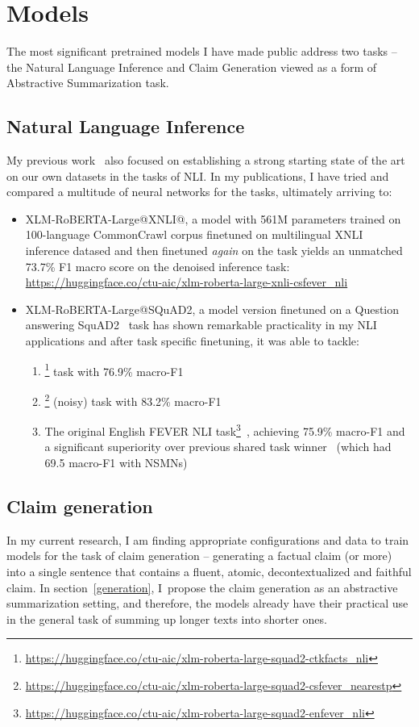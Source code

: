 \section{Models}
\label{sec:models}
The most significant pretrained models I have made public address two tasks -- the Natural Language Inference and Claim Generation viewed as a form of Abstractive Summarization task.
\subsection{Natural Language Inference}
My previous work~\cite{diplomka, lrev} also focused on establishing a strong starting state of the art on our own datasets in the tasks of NLI.
In my publications, I have tried and compared a multitude of neural networks for the tasks, ultimately arriving to:
\begin{itemize}
    \item {\techbf XLM-RoBERTA-Large@XNLI@\FCZNLI}, a model with 561M parameters trained on 100-language CommonCrawl corpus finetuned on multilingual XNLI~\cite{conneau2018xnli} inference datased and then finetuned \textit{again} on the \FCZNLI task yields an unmatched 73.7\% F1 macro score on the denoised \FCZNLI inference task: \url{https://huggingface.co/ctu-aic/xlm-roberta-large-xnli-csfever_nli}
    \item {\techbf XLM-RoBERTA-Large@SQuAD2}, a model version finetuned on a Question answering SquAD2~\cite{squad} task has shown remarkable practicality in my NLI applications and after task specific finetuning, it was able to tackle:
    \begin{enumerate}
        \item \CTKNLI\footnote{\url{https://huggingface.co/ctu-aic/xlm-roberta-large-squad2-ctkfacts_nli}} task with 76.9\% macro-F1
        \item \FCZ\footnote{\url{https://huggingface.co/ctu-aic/xlm-roberta-large-squad2-csfever_nearestp}} (noisy) task with 83.2\% macro-F1
        \item The original English FEVER NLI task\footnote{\url{https://huggingface.co/ctu-aic/xlm-roberta-large-squad2-enfever_nli}}~\cite{fever,nie2019combining}, achieving 75.9\% macro-F1 and a significant superiority over previous shared task winner~\cite{nie2019combining} (which had 69.5 macro-F1 with NSMNs)
    \end{enumerate}
\end{itemize}

\subsection{Claim generation}
In my current research, I am finding appropriate configurations and data to train models for the task of claim generation -- generating a factual claim (or more) into a single sentence that contains a fluent, atomic, decontextualized and faithful claim.
In section~\ref{generation}, I~propose the claim generation as an abstractive summarization setting, and therefore, the models already have their practical use in the general task of summing up longer texts into shorter ones.

